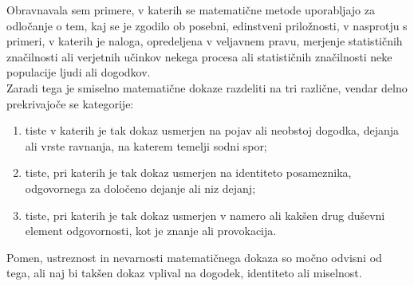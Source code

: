 \documentclass[12pt,a4paper]{amsart}
\theoremstyle{definition} %
\theoremstyle{plain} %
\begin{document}
Obravnavala sem primere, v katerih se matematične metode uporabljajo za odločanje o tem, kaj se je zgodilo ob posebni, edinstveni priložnosti, 
v nasprotju s primeri, v katerih je naloga, opredeljena v veljavnem pravu, merjenje statističnih značilnosti ali verjetnih učinkov nekega procesa 
ali statističnih značilnosti neke populacije ljudi ali dogodkov.\\
Zaradi tega je smiselno matematične dokaze razdeliti na tri različne, vendar delno prekrivajoče se kategorije:\\
\begin{enumerate}
    \item tiste v katerih je tak dokaz usmerjen na pojav ali neobstoj dogodka, dejanja ali vrste ravnanja, na katerem temelji sodni spor;
    \item tiste, pri katerih je tak dokaz usmerjen na identiteto posameznika, odgovornega za določeno dejanje ali niz dejanj;
    \item tiste, pri katerih je tak dokaz usmerjen v namero ali kakšen drug duševni element odgovornosti, kot je znanje ali provokacija.
\end{enumerate}
Pomen, ustreznost in nevarnosti matematičnega dokaza so močno odvisni od tega, ali naj bi takšen dokaz vplival na dogodek, identiteto ali miselnost.\\\\

\end{document}
